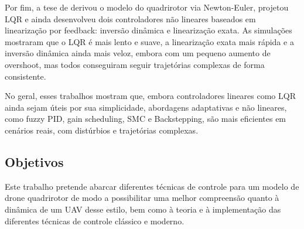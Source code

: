 Por fim, a tese de \cite{thesis} derivou o modelo do quadrirotor via Newton-Euler, projetou LQR e ainda 
desenvolveu dois controladores não lineares baseados em linearização por feedback: inversão dinâmica e 
linearização exata. As simulações mostraram que o LQR é mais lento e suave, a linearização exata mais 
rápida e a inversão dinâmica ainda mais veloz, embora com um pequeno aumento de overshoot, mas todos 
conseguiram seguir trajetórias complexas de forma consistente.

No geral, esses trabalhos mostram que, embora controladores lineares como LQR ainda sejam úteis por sua simplicidade, 
abordagens adaptativas e não lineares, como fuzzy PID, gain scheduling, SMC e Backstepping, são mais eficientes em 
cenários reais, com distúrbios e trajetórias complexas.

\subsection{Objetivos}
Este trabalho pretende abarcar diferentes técnicas de controle para um modelo de drone quadrirotor de modo a 
possibilitar uma melhor compreensão quanto à dinâmica de um UAV desse estilo, bem como à teoria e à implementação 
das diferentes técnicas de controle clássico e moderno.
